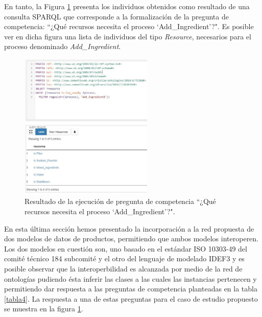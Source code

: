 \documentclass[journal]{IEEEtran}
\begin{document}
En tanto, la Figura \ref{fig13} presenta los individuos obtenidos como resultado de una consulta SPARQL que corresponde a la formalizaci\'on de la pregunta de competencia: ``¿Qu\'e recursos necesita el proceso ‘Add\_Ingredient’?". Es posible ver en dicha figura una lista de individuos del tipo \emph{Resource}, necesarios para el proceso denominado \emph{Add\_Ingredient}.

\begin{figure}[!t]
\centering
\includegraphics[width=2.5in]{figures/figure13.jpg}
\caption{Resultado de la ejecuci\'on de pregunta de competencia ``¿Qu\'e recursos necesita el proceso ‘Add\_Ingredient’?".}
\label{fig13}
\end{figure}


En esta \'ultima secci\'on hemos presentado la incorporación a la red propuesta de dos modelos de datos de productos, permitiendo que ambos modelos interoperen. Los dos modelos en cuesti\'on son, uno basado en el est\'andar ISO 10303-49 del comit\'e t\'ecnico 184 subcomit\'e y el otro del lenguaje de modelado IDEF3 y es posible observar que  la interoperbilidad es alcanzada por medio de la red de ontolog\'ias pudiendo \'esta inferir las clases a las cuales las instancias pertenecen y permitiendo dar respuesta a las preguntas de competencia planteadas en la tabla \ref{tabla4}. La respuesta a una de estas preguntas para el caso de estudio propuesto se muestra en la figura \ref{fig13}.

%
%
\end{document}
